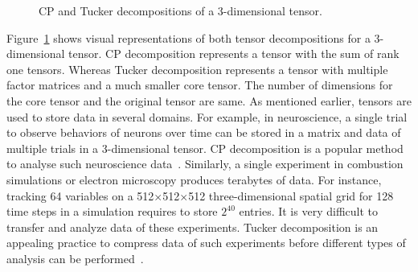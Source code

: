 \documentclass[a4paper,11pt]{article}
\begin{document}
\begin{figure}[htb]
\begin{center}
{}
			\vspace*{-0.125cm}\caption{CP and Tucker decompositions of a 3-dimensional tensor.\label{fig:CTdecompositions}}
		\end{center}\vspace*{-0.205cm}		
	\end{figure}
	
	
	
	
	Figure~\ref{fig:CTdecompositions} shows visual representations of both tensor decompositions for a 3-dimensional tensor. CP decomposition represents a tensor with the sum of rank one tensors. Whereas Tucker decomposition represents a tensor with multiple factor matrices and a much smaller core tensor. The number of dimensions for the core tensor and the original tensor are same. As mentioned earlier, tensors are used to store data in several domains. For example, in neuroscience, a single trial to observe behaviors of neurons over time can be stored in a matrix and data of multiple trials in a 3-dimensional tensor. CP decomposition is a popular method to analyse such neuroscience data~\cite{HKD-SIAM-2020}. Similarly, a single experiment in combustion simulations or electron microscopy produces terabytes of data. For instance, tracking 64 variables on a 512$\times$512$\times$512 three-dimensional spatial grid for 128 time steps in a simulation requires to store $2^{40}$ entries. It is very difficult to transfer and analyze data of these experiments. Tucker decomposition is an appealing practice to compress data of such experiments before different types of analysis can be performed~\cite{ABK-IPDPS-2016,BKK-TOMS-2020,RC-CILS-1998}.
	
\end{document}
